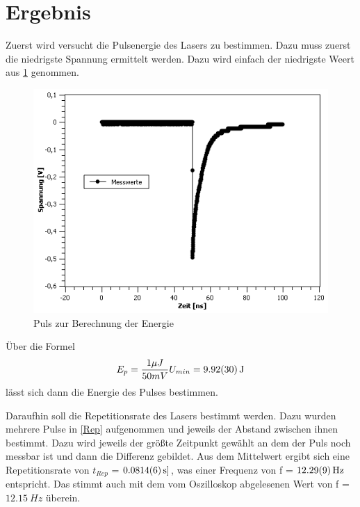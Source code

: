 \documentclass[
	a4paper,
	12pt,
	pagesize,
	ngerman
]{scrartcl}
\begin{document}
\section{Ergebnis}
Zuerst wird versucht die Pulsenergie des Lasers zu bestimmen. Dazu muss zuerst die niedrigste Spannung ermittelt werden. Dazu wird einfach der niedrigste Weert aus \cref{Energie} genommen. 

\begin{figure}[h!]
	\centering
	\includegraphics[scale=0.7]{Energie.png}
	\caption{Puls zur Berechnung der Energie}
	\label{Energie}
\end{figure}

Über die Formel
\begin{equation}
E_{p} = \dfrac{1 \mu J}{50mV}U_{min} = \SI{9,92 \pm 0,30}{J}
\end{equation}
lässt sich dann die Energie des Pulses bestimmen.

Daraufhin soll die Repetitionsrate des Lasers bestimmt werden. Dazu wurden mehrere Pulse in \cref{Rep} aufgenommen und jeweils der Abstand zwischen ihnen bestimmt. Dazu wird jeweils der größte Zeitpunkt gewählt an dem der Puls noch messbar ist und dann die Differenz gebildet. Aus dem Mittelwert ergibt sich eine Repetitionsrate von $t_{Rep}$ = $\SI{0,0814 \pm 0,0006}{s]}$, was einer Frequenz von f = $\SI{12,29 \pm 0,09}{Hz}$ entspricht. Das stimmt auch mit dem vom Oszilloskop abgelesenen Wert von f = $\SI{12,15}{Hz}$ überein.
\end{document}
